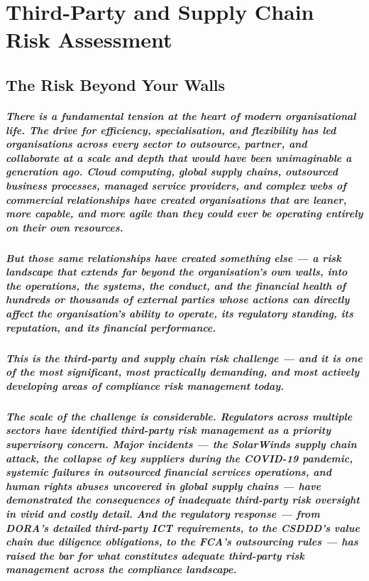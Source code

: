 \chapter{Third-Party and Supply Chain Risk Assessment}
\label{chap:Third-Party and Supply Chain Risk Assessment}

\section{The Risk Beyond Your Walls}
\paragraph{There is a fundamental tension at the heart of modern organisational life. The drive for efficiency, specialisation, and flexibility has led organisations across every sector to outsource, partner, and collaborate at a scale and depth that would have been unimaginable a generation ago. Cloud computing, global supply chains, outsourced business processes, managed service providers, and complex webs of commercial relationships have created organisations that are leaner, more capable, and more agile than they could ever be operating entirely on their own resources.}
\paragraph{But those same relationships have created something else — a risk landscape that extends far beyond the organisation's own walls, into the operations, the systems, the conduct, and the financial health of hundreds or thousands of external parties whose actions can directly affect the organisation's ability to operate, its regulatory standing, its reputation, and its financial performance.}
\paragraph{This is the third-party and supply chain risk challenge — and it is one of the most significant, most practically demanding, and most actively developing areas of compliance risk management today.}
\paragraph{The scale of the challenge is considerable. Regulators across multiple sectors have identified third-party risk management as a priority supervisory concern. Major incidents — the SolarWinds supply chain attack, the collapse of key suppliers during the COVID-19 pandemic, systemic failures in outsourced financial services operations, and human rights abuses uncovered in global supply chains — have demonstrated the consequences of inadequate third-party risk oversight in vivid and costly detail. And the regulatory response — from DORA's detailed third-party ICT requirements, to the CSDDD's value chain due diligence obligations, to the FCA's outsourcing rules — has raised the bar for what constitutes adequate third-party risk management across the compliance landscape.}
